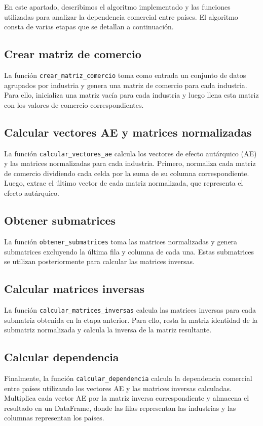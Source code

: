 \documentclass[5p,authoryear]{elsarticle}
\begin{document}
En este apartado, describimos el algoritmo implementado y las funciones utilizadas para analizar la dependencia comercial entre países. El algoritmo consta de varias etapas que se detallan a continuación.

\subsection{Crear matriz de comercio}

La función \texttt{crear\_matriz\_comercio} toma como entrada un conjunto de datos agrupados por industria y genera una matriz de comercio para cada industria. Para ello, inicializa una matriz vacía para cada industria y luego llena esta matriz con los valores de comercio correspondientes.

\subsection{Calcular vectores AE y matrices normalizadas}

La función \texttt{calcular\_vectores\_ae} calcula los vectores de efecto autárquico (AE) y las matrices normalizadas para cada industria. Primero, normaliza cada matriz de comercio dividiendo cada celda por la suma de su columna correspondiente. Luego, extrae el último vector de cada matriz normalizada, que representa el efecto autárquico.

\subsection{Obtener submatrices}

La función \texttt{obtener\_submatrices} toma las matrices normalizadas y genera submatrices excluyendo la última fila y columna de cada una. Estas submatrices se utilizan posteriormente para calcular las matrices inversas.

\subsection{Calcular matrices inversas}

La función \texttt{calcular\_matrices\_inversas} calcula las matrices inversas para cada submatriz obtenida en la etapa anterior. Para ello, resta la matriz identidad de la submatriz normalizada y calcula la inversa de la matriz resultante.

\subsection{Calcular dependencia}

Finalmente, la función \texttt{calcular\_dependencia} calcula la dependencia comercial entre países utilizando los vectores AE y las matrices inversas calculadas. Multiplica cada vector AE por la matriz inversa correspondiente y almacena el resultado en un DataFrame, donde las filas representan las industrias y las columnas representan los países. 
\end{document}
